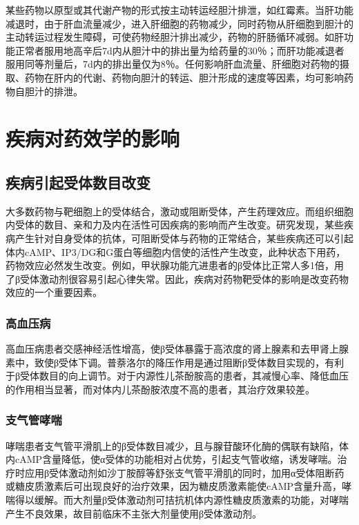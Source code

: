 某些药物以原型或其代谢产物的形式按主动转运经胆汁排泄，如红霉素。当肝功能减退时，由于肝血流量减少，进入肝细胞的药物减少，同时药物从肝细胞到胆汁的主动转运过程发生障碍，可使药物经胆汁排出减少，药物的肝肠循环减弱。如肝功能正常者服用地高辛后7d内从胆汁中的排出量为给药量的30％；而肝功能减退者服用同等剂量后，7d内的排出量仅为8％。任何影响肝血流量、肝细胞对药物的摄取、药物在肝内的代谢、药物向胆汁的转运、胆汁形成的速度等因素，均可影响药物自胆汁的排泄。

\section{疾病对药效学的影响}

\subsection{疾病引起受体数目改变}

大多数药物与靶细胞上的受体结合，激动或阻断受体，产生药理效应。而组织细胞内受体的数目、亲和力及内在活性可因疾病的影响而产生改变。研究发现，某些疾病产生针对自身受体的抗体，可阻断受体与药物的正常结合，某些疾病还可以引起体内cAMP、IP3/DG和G蛋白等细胞内信使的活性产生改变，此种状态下用药，药物效应必然发生改变。例如，甲状腺功能亢进患者的β受体比正常人多1倍，用了β受体激动剂很容易引起心律失常。因此，疾病对药物靶受体的影响是改变药物效应的一个重要因素。

\subsubsection{高血压病}

高血压病患者交感神经活性增高，使β受体暴露于高浓度的肾上腺素和去甲肾上腺素中，致使β受体下调。普萘洛尔的降压作用是通过阻断β受体数目实现的，有利于β受体数目的向上调节。对于内源性儿茶酚胺高的患者，其减慢心率、降低血压的作用相当显著，而对体内儿茶酚胺浓度不高的患者，其治疗效果较差。

\subsubsection{支气管哮喘}

哮喘患者支气管平滑肌上的β受体数目减少，且与腺苷酸环化酶的偶联有缺陷，体内cAMP含量降低，使α受体的功能相对占优势，引起支气管收缩，诱发哮喘。治疗时应用β受体激动剂如沙丁胺醇等舒张支气管平滑肌的同时，加用α受体阻断药或糖皮质激素后可出现良好的治疗效果，因为糖皮质激素能使cAMP含量升高，哮喘得以缓解。而大剂量β受体激动剂可拮抗机体内源性糖皮质激素的功能，对哮喘产生不良效果，故目前临床不主张大剂量使用β受体激动剂。

